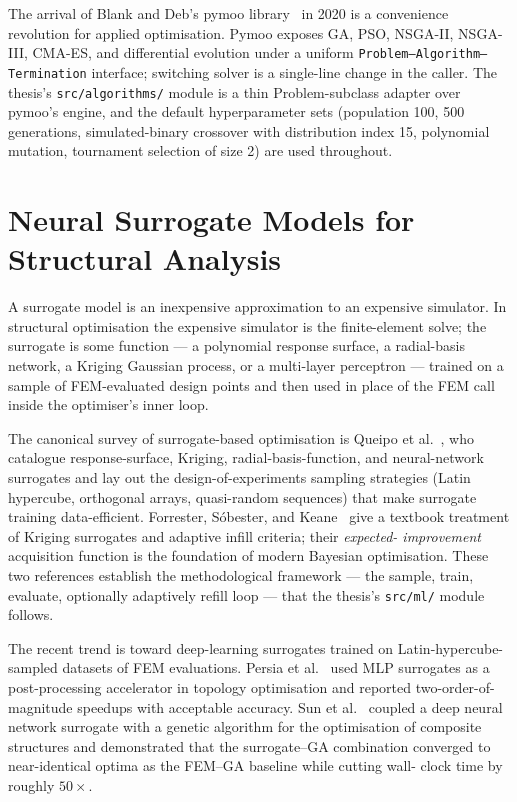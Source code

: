 The arrival of Blank and Deb's pymoo
library~\cite{blank2020pymoo} in 2020 is a convenience revolution
for applied optimisation. Pymoo exposes GA, PSO, NSGA-II,
NSGA-III, CMA-ES, and differential evolution under a uniform
\texttt{Problem--Algorithm--Termination} interface; switching
solver is a single-line change in the caller. The thesis's
\texttt{src/algorithms/} module is a thin Problem-subclass adapter
over pymoo's engine, and the default hyperparameter sets
(population \num{100}, \num{500} generations, simulated-binary
crossover with distribution index \num{15}, polynomial mutation,
tournament selection of size \num{2}) are used throughout.

\section{Neural Surrogate Models for Structural Analysis}
\label{sec:lit:surrogate}

A surrogate model is an inexpensive approximation to an expensive
simulator. In structural optimisation the expensive simulator is
the finite-element solve; the surrogate is some function --- a
polynomial response surface, a radial-basis network, a Kriging
Gaussian process, or a multi-layer perceptron --- trained on a
sample of FEM-evaluated design points and then used in place of
the FEM call inside the optimiser's inner loop.

The canonical survey of surrogate-based optimisation is Queipo et
al.~\cite{queipo2005}, who catalogue response-surface, Kriging,
radial-basis-function, and neural-network surrogates and lay out
the design-of-experiments sampling strategies (Latin hypercube,
orthogonal arrays, quasi-random sequences) that make surrogate
training data-efficient. Forrester, S\'obester, and
Keane~\cite{forrester2008} give a textbook treatment of Kriging
surrogates and adaptive infill criteria; their \emph{expected-
improvement} acquisition function is the foundation of modern
Bayesian optimisation. These two references establish the
methodological framework --- the sample, train, evaluate,
optionally adaptively refill loop --- that the thesis's
\texttt{src/ml/} module follows.

The recent trend is toward deep-learning surrogates trained on
Latin-hypercube-sampled datasets of FEM evaluations. Persia et
al.~\cite{persia2025} used MLP surrogates as a post-processing
accelerator in topology optimisation and reported two-order-of-
magnitude speedups with acceptable accuracy. Sun et
al.~\cite{sun2023} coupled a deep neural network surrogate with a
genetic algorithm for the optimisation of composite structures and
demonstrated that the surrogate--GA combination converged to
near-identical optima as the FEM--GA baseline while cutting wall-
clock time by roughly $50\times$.

